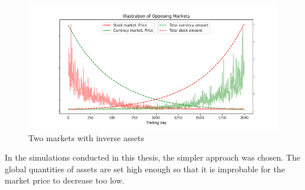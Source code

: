 \begin{figure}[H]
    \includegraphics[width=\linewidth]{plots/opposing_markets.png}
    \caption{Two markets with inverse assets}
    \label{fig:opposing_markets}
\end{figure}



In the simulations conducted in this thesis, the simpler approach was chosen. 
The global quantities of assets are set high enough so that it is improbable 
for the market price to decrease too low. 


